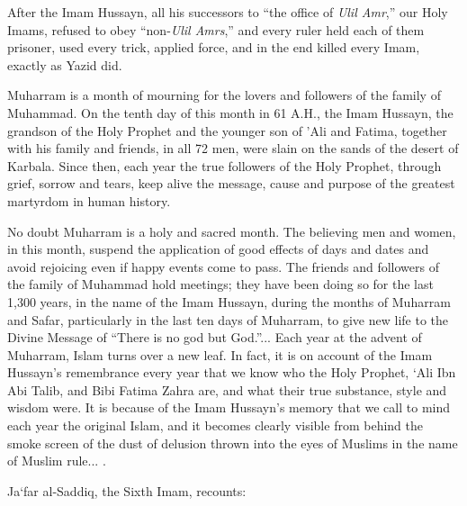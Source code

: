 After the Imam Hussayn, all his successors to ``the office of \emph{Ulil Amr},'' our Holy Imams, refused to obey ``non-\emph{Ulil Amrs},'' and every ruler held each of them prisoner, used every trick, applied force, and in the end killed every Imam, exactly as Yazid did.

Muharram is a month of mourning for the lovers and followers of the family of Muhammad. On the tenth day of this month in 61 A.H., the Imam Hussayn, the grandson of the Holy Prophet and the younger son of 'Ali and Fatima, together with his family and friends, in all 72 men, were slain on the sands of the desert of Karbala. Since then, each year the true followers of the Holy Prophet, through grief, sorrow and tears, keep alive the message, cause and purpose of the greatest martyrdom in human history.

No doubt Muharram is a holy and sacred month. The believing men and women, in this month, suspend the application of good effects of days and dates and avoid rejoicing even if happy events come to pass. The friends and followers of the family of Muhammad hold meetings; they have been doing so for the last 1,300 years, in the name of the Imam Hussayn, during the months of Muharram and Safar, particularly in the last ten days of Muharram, to give new life to the Divine Message of ``There is no god but God.''... Each year at the advent of Muharram, Islam turns over a new leaf. In fact, it is on account of the Imam Hussayn's remembrance every year that we know who the Holy Prophet, `Ali Ibn Abi Talib, and Bibi Fatima Zahra are, and what their true substance, style and wisdom were. It is because of the Imam Hussayn's memory that we call to mind each year the original Islam, and it becomes clearly visible from behind the smoke screen of the dust of delusion thrown into the eyes of Muslims in the name of Muslim rule... .

Ja`far al-Saddiq, the Sixth Imam, recounts:

